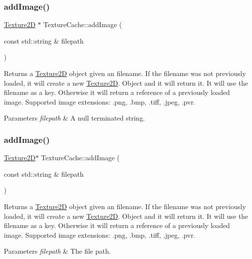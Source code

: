 \subsubsection{\texorpdfstring{add\+Image()}{addImage()}\hspace{0.1cm}{\footnotesize\ttfamily [1/4]}}
{\footnotesize\ttfamily \hyperlink{classTexture2D}{Texture2D} $\ast$ Texture\+Cache\+::add\+Image (\begin{DoxyParamCaption}\item[{const std\+::string \&}]{filepath }\end{DoxyParamCaption})}

Returns a \hyperlink{classTexture2D}{Texture2D} object given an filename. If the filename was not previously loaded, it will create a new \hyperlink{classTexture2D}{Texture2D}. Object and it will return it. It will use the filename as a key. Otherwise it will return a reference of a previously loaded image. Supported image extensions\+: .png, .bmp, .tiff, .jpeg, .pvr. 
\begin{DoxyParams}{Parameters}
{\em filepath} & A null terminated string. \\
\hline
\end{DoxyParams}
\mbox{\label{classTextureCache_a95d8fe88c5a3c5ac20627861d5ac7033}} 
\subsubsection{\texorpdfstring{add\+Image()}{addImage()}\hspace{0.1cm}{\footnotesize\ttfamily [2/4]}}
{\footnotesize\ttfamily \hyperlink{classTexture2D}{Texture2D}$\ast$ Texture\+Cache\+::add\+Image (\begin{DoxyParamCaption}\item[{const std\+::string \&}]{filepath }\end{DoxyParamCaption})}

Returns a \hyperlink{classTexture2D}{Texture2D} object given an filename. If the filename was not previously loaded, it will create a new \hyperlink{classTexture2D}{Texture2D}. Object and it will return it. It will use the filename as a key. Otherwise it will return a reference of a previously loaded image. Supported image extensions\+: .png, .bmp, .tiff, .jpeg, .pvr. 
\begin{DoxyParams}{Parameters}
{\em filepath} & The file path. \\
\hline
\end{DoxyParams}
\mbox{\label{classTextureCache_a286a3f1f96a59ebf2addb972e15e87a7}} 
